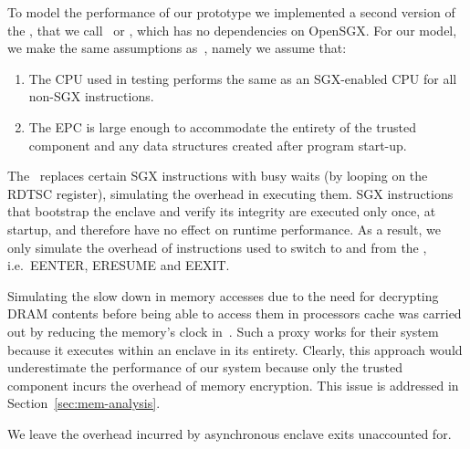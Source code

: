 \documentclass[../../../main.tex]{subfiles}
\begin{document}
\label{sec:perfmodel}
To model the performance of our prototype we implemented a second version of
the \enclaveprogram, that we call \busywait~or \enclavemodel, which
has no dependencies on OpenSGX. For our model, we make the same assumptions
as~\cite{Baumann14}, namely we assume that:
\begin{enumerate}
  \item The CPU used in testing performs the same as an SGX-enabled CPU for
    all non-SGX instructions.
  \item The EPC is large enough to accommodate the entirety of the trusted
    component and any data structures created after program start-up.
\end{enumerate}

The \busywait~replaces certain SGX instructions with busy waits (by looping on
the RDTSC register), simulating the overhead in executing them. SGX
instructions that bootstrap the enclave and verify its integrity are executed
only once, at startup, and therefore have no effect on runtime performance. As
a result, we only simulate the overhead of instructions used to switch to and
from the \enclaveprogram, i.e.\ EENTER, ERESUME and EEXIT.

Simulating the slow down in memory accesses due to the need for decrypting
DRAM contents before being able to access them in processors cache was carried
out by reducing the memory's clock in~\cite{Baumann14}. Such a proxy works for
their system because it executes within an enclave in its entirety. Clearly,
this approach would underestimate the performance of our system because only
the trusted component incurs the overhead of memory encryption. This issue is
addressed in Section~\ref{sec:mem-analysis}.

We leave the overhead incurred by asynchronous enclave exits unaccounted for.
\end{document}

